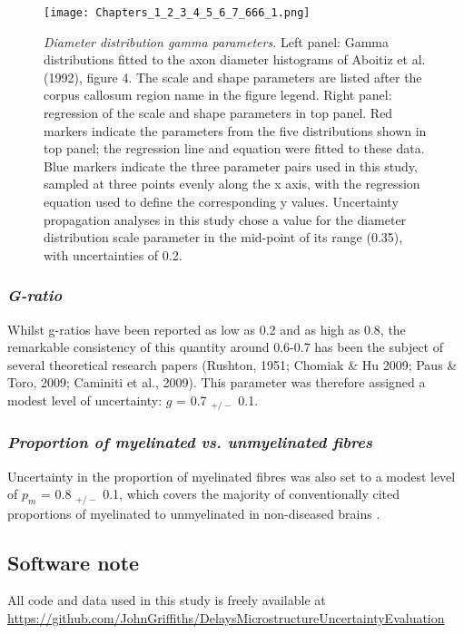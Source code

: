 

\begin{figure}[h!]
\begin{center}
\texttt{[image: Chapters\_1\_2\_3\_4\_5\_6\_7\_666\_1.png]}%
\end{center}
\caption[\emph{Diameter distribution gamma parameters. }]{\emph{Diameter distribution gamma parameters. }Left panel: Gamma distributions fitted to the axon diameter histograms of Aboitiz et al. (1992), 
figure 4. The scale and shape parameters are listed after the corpus callosum region name 
in the figure legend. Right panel: regression of the scale and shape parameters in top panel. 
Red markers indicate the parameters from the five distributions shown in top panel;
the regression line and equation were fitted to these data. Blue markers indicate the 
three parameter pairs used in this study, sampled at three points evenly along the x axis, with the regression equation used to define the corresponding y values.  Uncertainty propagation analyses in this study chose a value for the diameter distribution  scale parameter in the mid-point of its range (0.35), with uncertainties of 0.2.}\label{fig:4}
\end{figure}



\subsubsection*{\textit{G-ratio}}

Whilst g-ratios have been reported as low as 0.2 and as high as 0.8, the
remarkable consistency of this quantity around 0.6-0.7 has been the
subject of several theoretical research papers (Rushton, 1951; Chomiak
\& Hu 2009; Paus \& Toro, 2009; Caminiti et al., 2009). This parameter
was therefore assigned a modest level of uncertainty: $g$ = 0.7 $_{+/-}$
0.1. 

\subsubsection*{\textit{Proportion of myelinated vs. unmyelinated fibres}}

Uncertainty in the proportion of myelinated fibres was
also set to a modest level of $p_{m}$ = 0.8 $_{+/-}$ 0.1, which covers
the majority of conventionally cited proportions of myelinated to
unmyelinated in non-diseased brains  .

 
\subsection{Software note}

All code and data used in this study is freely available at \url{https://github.com/JohnGriffiths/DelaysMicrostructureUncertaintyEvaluation}


